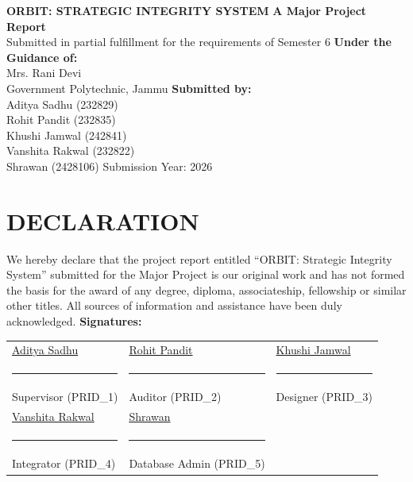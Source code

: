 ﻿\documentclass[12pt]{article}
\def\normaltext{\fontsize{12pt}{18pt}\color{secondary}}
\begin{document}
\begin{center}
\vspace{1cm}
{\LARGE\color{primary}\textbf{ORBIT: STRATEGIC INTEGRITY SYSTEM}}
\vspace{1cm}
\medskip
{\large\color{secondary}\textbf{A Major Project Report}} \\
Submitted in partial fulfillment for the requirements of Semester 6
\vspace{2cm}
\medskip
{\color{primary}\textbf{Under the Guidance of:}} \\
Mrs. Rani Devi \\
Government Polytechnic, Jammu
\vspace{2cm}
\medskip
\textbf{Submitted by:} \\
Aditya Sadhu (232829) \\
Rohit Pandit (232835) \\
Khushi Jamwal (242841) \\
Vanshita Rakwal (232822) \\
Shrawan (2428106)
\vspace{2cm}
\medskip
Submission Year: 2026
\end{center}
\newpage

\section*{{\color{primary}DECLARATION}}
\normaltext
We hereby declare that the project report entitled ``{\color{secondary}ORBIT: Strategic Integrity System}'' submitted for the Major Project is our original work and has not formed the basis for the award of any degree, diploma, associateship, fellowship or similar other titles. All sources of information and assistance have been duly acknowledged.
\vspace{2cm}
\noindent\textbf{Signatures:}
\vspace{1cm}
\begin{tabular}{p{6cm}p{6cm}p{6cm}}
{\color{dark}\underline{Aditya Sadhu}} & {\color{dark}\underline{Rohit Pandit}} & {\color{dark}\underline{Khushi Jamwal}} \\
\rule{5cm}{0.4pt} & \rule{5cm}{0.4pt} & \rule{5cm}{0.4pt} \\
Supervisor (PRID\_1) & Auditor (PRID\_2) & Designer (PRID\_3) \\[1cm]
{\color{dark}\underline{Vanshita Rakwal}} & {\color{dark}\underline{Shrawan}} &  \\
\rule{5cm}{0.4pt} & \rule{5cm}{0.4pt} &  \\
Integrator (PRID\_4) & Database Admin (PRID\_5) & 
\end{tabular}
\newpage
\end{document}
